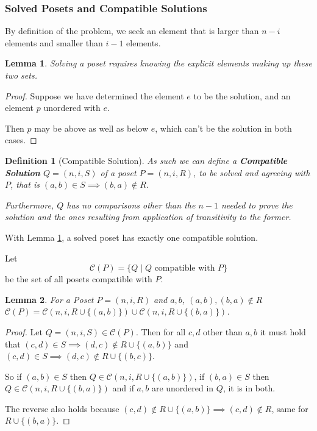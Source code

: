 \documentclass[10pt,journal,compsoc]{IEEEtran}
\newtheorem{lemma}{Lemma}
\newtheorem{definition}{Definition}
\begin{document}

\subsubsection{Solved Posets and Compatible Solutions}
By definition of the problem, we seek an
element that is larger than $n-i$ elements and smaller than
$i-1$ elements.

\begin{lemma}\label{lemma:partition}
  Solving a poset requires knowing the explicit elements
  making up these two sets.
\end{lemma}
\begin{proof}
  Suppose we have determined the element $e$ to be the
  solution, and an element $p$ unordered with $e$.

  Then $p$ may be above as well as below $e$, which
  can't be the solution in both cases.
\end{proof}

\begin{definition}[Compatible Solution]
  As such we can define a \textbf{Compatible Solution} $Q = (n, i, S)$ of a poset $P=(n, i, R)$, to be solved and agreeing with $P$, that is $(a, b)\in S\implies (b, a)\notin R$.

  Furthermore, $Q$ has no comparisons other than the $n-1$ needed to prove
  the solution and the ones resulting from application of transitivity to the former.
\end{definition}

With Lemma \ref{lemma:partition}, a solved poset has exactly one compatible solution.

Let $$\mathcal{C}(P) = \{Q \mid Q \text{ compatible with } P\}$$ be the set of all posets compatible with $P$.

\begin{lemma}\label{lemma:compatible_union}
  For a Poset $P = (n, i, R)$ and $a, b$, $(a,b), (b,a)\notin R$
  $\mathcal{C}(P) = \mathcal{C}(n, i, R\cup \{(a, b)\}) \cup \mathcal{C}(n, i, R\cup \{(b, a)\})$.
\end{lemma}
\begin{proof}
  Let $Q = (n, i, S)\in \mathcal{C}(P)$. Then for all $c, d$ other than $a, b$ it must hold that $(c,d)\in S\implies (d,c)\notin R\cup \{(a, b)\}$ and $(c,d)\in S\implies (d,c)\notin R\cup \{(b, c)\}$.

  So if $(a, b)\in S$ then $Q\in\mathcal{C}(n, i, R\cup \{(a, b)\})$,
  if $(b, a)\in S$ then $Q\in\mathcal{C}(n, i, R\cup \{(b, a)\})$
  and if $a, b$ are unordered in $Q$, it is in both.

  The reverse also holds because $(c,d)\notin R\cup \{(a, b)\}\implies (c,d)\notin R$, same for $R\cup \{(b, a)\}$.
\end{proof}
\end{document}
